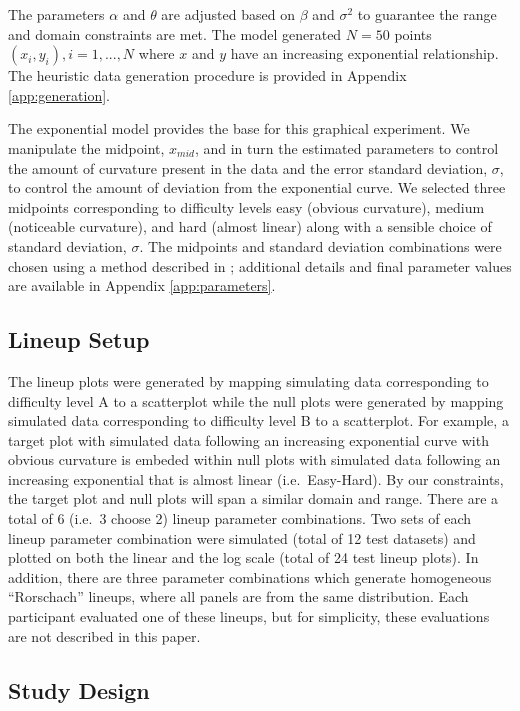 \documentclass[]{interact}
\theoremstyle{plain}%
\theoremstyle{definition}
\theoremstyle{remark}
\begin{document}
\noindent The parameters \(\alpha\) and \(\theta\) are adjusted based on
\(\beta\) and \(\sigma^2\) to guarantee the range and domain constraints
are met. The model generated \(N = 50\) points
\((x_i, y_i), i = 1,...,N\) where \(x\) and \(y\) have an increasing
exponential relationship. The heuristic data generation procedure is
provided in Appendix \ref{app:generation}.

The exponential model provides the base for this graphical experiment.
We manipulate the midpoint, \(x_{mid}\), and in turn the estimated
parameters to control the amount of curvature present in the data and
the error standard deviation, \(\sigma\), to control the amount of
deviation from the exponential curve. We selected three midpoints
corresponding to difficulty levels easy (obvious curvature), medium
(noticeable curvature), and hard (almost linear) along with a sensible
choice of standard deviation, \(\sigma\). The midpoints and standard
deviation combinations were chosen using a method described in
\cite{vanderplas_clusters_2017}; additional details and final parameter
values are available in Appendix \ref{app:parameters}.

\hypertarget{lineup-setup}{%
\subsection{Lineup Setup}\label{lineup-setup}}

The lineup plots were generated by mapping simulating data corresponding
to difficulty level A to a scatterplot while the null plots were
generated by mapping simulated data corresponding to difficulty level B
to a scatterplot. For example, a target plot with simulated data
following an increasing exponential curve with obvious curvature is
embeded within null plots with simulated data following an increasing
exponential that is almost linear (i.e.~Easy-Hard). By our constraints,
the target plot and null plots will span a similar domain and range.
There are a total of 6 (i.e.~3 choose 2) lineup parameter combinations.
Two sets of each lineup parameter combination were simulated (total of
12 test datasets) and plotted on both the linear and the log scale
(total of 24 test lineup plots). In addition, there are three parameter
combinations which generate homogeneous ``Rorschach'' lineups, where all
panels are from the same distribution. Each participant evaluated one of
these lineups, but for simplicity, these evaluations are not described
in this paper.

\hypertarget{study-design}{%
\subsection{Study Design}\label{study-design}}
\end{document}
